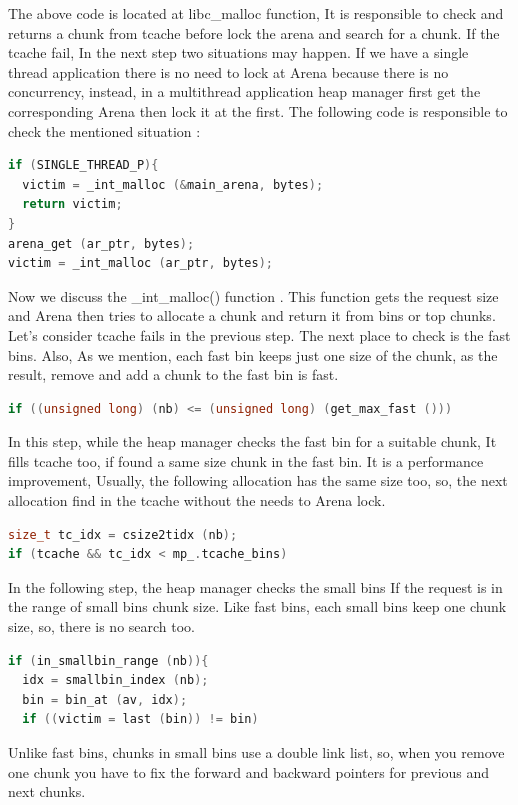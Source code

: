 \documentclass{masterthesis}
\newcommand*\tch{tcache}
\begin{document}
The above code is located at libc\_malloc function, It is responsible to check and returns a chunk from tcache before lock the arena and search for a chunk. If the \tch{} fail, In the next step two situations may happen. If we have a single thread application there is no need to lock at Arena because there is no concurrency, instead, in a multi\-thread application heap manager first get the corresponding Arena then lock it at the first. The following code is responsible to check the mentioned situation :
\begin{lstlisting}[language=c,frame=tlrb]
if (SINGLE_THREAD_P){
  victim = _int_malloc (&main_arena, bytes);
  return victim;
}
arena_get (ar_ptr, bytes);
victim = _int_malloc (ar_ptr, bytes);
\end{lstlisting}

Now we discuss the \_int\_malloc() function . This function gets the request size and Arena then tries to allocate a chunk and return it from bins or top chunks. Let's consider \tch{} fails in the previous step. The next place to check is the fast bins. Also, As we mention, each fast bin keeps just one size of the chunk, as the result, remove and add a chunk to the fast bin is fast.
\begin{lstlisting}[language=c,frame=tlrb]
if ((unsigned long) (nb) <= (unsigned long) (get_max_fast ()))
\end{lstlisting}
In this step, while the heap manager checks the fast bin for a suitable chunk, It fills \tch{} too, if found a same size chunk in the fast bin. It is a performance improvement, Usually, the following allocation has the same size too, so, the next allocation find in the \tch{} without the needs to Arena lock.
\begin{lstlisting}[language=c,frame=tlrb]
size_t tc_idx = csize2tidx (nb);
if (tcache && tc_idx < mp_.tcache_bins)
\end{lstlisting}

In the following step, the heap manager checks the small bins If the request is in the range of small bins chunk size. Like fast bins, each small bins keep one chunk size, so, there is no search too.
\begin{lstlisting}[language=c,frame=tlrb]
if (in_smallbin_range (nb)){
  idx = smallbin_index (nb);
  bin = bin_at (av, idx);
  if ((victim = last (bin)) != bin)
\end{lstlisting}

Unlike fast bins, chunks in small bins use a double link list, so, when you remove one chunk you have to fix the forward and backward pointers for previous and next chunks. 
\end{document}
